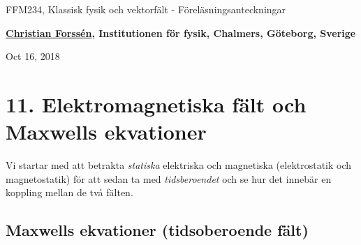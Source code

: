\documentclass[%
oneside,                 %
final,                   %
10pt]{article}
\begin{document}

\newcommand{\exercisesection}[1]{\subsection*{#1}}







\thispagestyle{empty}

\begin{center}
{\LARGE\bf
\begin{spacing}{1.25}
FFM234, Klassisk fysik och vektorfält - Föreläsningsanteckningar
\end{spacing}
}
\end{center}


\begin{center}
{\bf \href{{http://fy.chalmers.se/subatom/tsp/}}{Christian Forssén}, Institutionen för fysik, Chalmers, Göteborg, Sverige${}^{}$} \\ [0mm]
\end{center}

\begin{center}
\end{center}
    

\begin{center}
Oct 16, 2018
\end{center}

\vspace{1cm}


\section*{11. Elektromagnetiska fält och Maxwells ekvationer}

Vi startar med att betrakta \emph{statiska} elektriska och magnetiska (elektrostatik och magnetostatik) för att sedan ta med \emph{tidsberoendet} och se hur det innebär en koppling mellan de två fälten.

\subsection*{Maxwells ekvationer (tidsoberoende fält)}
\end{document}
